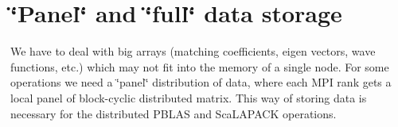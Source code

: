 \hypertarget{data_dist_data_dist1}{}\section{\char`\"{}\+Panel\char`\"{} and \char`\"{}full\char`\"{} data storage}\label{data_dist_data_dist1}
We have to deal with big arrays (matching coefficients, eigen vectors, wave functions, etc.) which may not fit into the memory of a single node. For some operations we need a \char`\"{}panel\char`\"{} distribution of data, where each M\+P\+I rank gets a local panel of block-\/cyclic distributed matrix. This way of storing data is necessary for the distributed P\+B\+L\+A\+S and Sca\+L\+A\+P\+A\+C\+K operations. 